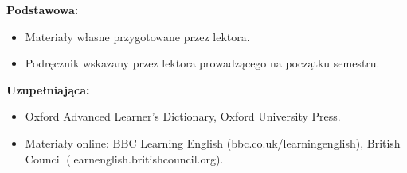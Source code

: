 \documentclass[12pt, a4paper]{article}
\begin{document}
\textbf{Podstawowa:}
\begin{itemize}
  \item Materiały własne przygotowane przez lektora.
  \item Podręcznik wskazany przez lektora prowadzącego na początku semestru.
\end{itemize}

\textbf{Uzupełniająca:}
\begin{itemize}
  \item Oxford Advanced Learner's Dictionary, Oxford University Press.
  \item Materiały online: BBC Learning English (bbc.co.uk/learningenglish), British Council (learnenglish.britishcouncil.org).
\end{itemize}
\end{document}
